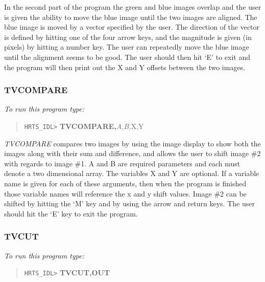 In the second part of the program the green and blue images overlap and the
user is given the ability to move the blue image until the two images are
aligned.  The blue image is moved by a vector specified by the user.  The
direction of the vector is defined by hitting one of the four arrow keys, and
the magnitude is given (in pixels) by hitting a number key.  The user can
repeatedly move the blue image until the alignment seems to be good.  The user
should then hit `E' to exit and the program will then print out the X and Y
offsets between the two images.

\subsubsection{TVCOMPARE}

{\em To run this program type:}
\begin{quote}
     {\tt HRTS\_IDL>} {\bf TVCOMPARE,}{\it A,B,}X,Y
\end{quote}

{\em TVCOMPARE} compares two images by using the image display to show both the
images along with their sum and difference, and allows the user to shift image
\#2 with regards to image \#1. A and B are required parameters and each must
denote a two dimensional array. The variables X and Y are optional. If a
variable name is given for each of these arguments, then when the program is
finished those variable names will reference the x and y shift values.  Image
\#2 can be shifted by hitting the `M' key and by using the arrow and return
keys. The user should hit the `E' key to exit the program.

\subsubsection{TVCUT}

{\em To run this program type:}
\begin{quote}
     {\tt HRTS\_IDL>} {\bf TVCUT,OUT}
\end{quote}


